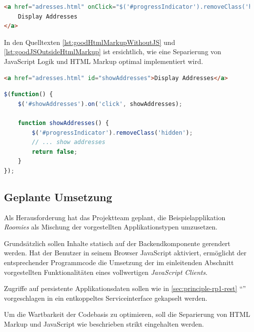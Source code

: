 \begin{lstlisting}[language=HTML, caption={Beispiel einer Vermischung von HTML Markup und JavaScript}, label={lst:badHtmlMarkupWithJavaScript}]
<a href="adresses.html" onClick="$('#progressIndicator').removeClass('hidden');showAddresses();return false;">
	Display Addresses
</a>
\end{lstlisting}

In den Quelltexten \ref{lst:goodHtmlMarkupWithoutJS} und \ref{lst:goodJSOutsideHtmlMarkup} ist ersichtlich, wie eine Separierung von JavaScript Logik und HTML Markup optimal implementiert wird.

\begin{lstlisting}[language=HTML, caption={Beispiel eines sauberen HTML Markups ohne JavaScript}, label={lst:goodHtmlMarkupWithoutJS}]
<a href="adresses.html" id="showAddresses">Display Addresses</a>
\end{lstlisting}

\begin{lstlisting}[language=JavaScript, caption={Beispiel Event-Handler in ausgelagerter JavaScript Datei}, label={lst:goodJSOutsideHtmlMarkup}]
$(function() {
	$('#showAddresses').on('click', showAddresses);

	function showAddresses() {
		$('#progressIndicator').removeClass('hidden');
		// ... show addresses
		return false;
	}
});
\end{lstlisting}


\subsection*{Geplante Umsetzung}

Als Herausforderung hat das Projektteam geplant, die Beispielapplikation \emph{Roomies} als Mischung der vorgestellten Applikationstypen umzusetzen.

Grundsätzlich sollen Inhalte statisch auf der Backendkomponente gerendert werden. Hat der Benutzer in seinem Browser JavaScript aktiviert, ermöglicht der entsprechender Programmcode die Umsetzung der im einleitenden Abschnitt vorgestellten Funktionalitäten eines vollwertigen \emph{JavaScript Clients}.

Zugriffe auf persistente Applikationsdaten sollen wie in \ref{sec:principle-rp1-rest} ``'' vorgeschlagen in ein entkoppeltes Serviceinterface gekapselt werden.

Um die Wartbarkeit der Codebasis zu optimieren, soll die Separierung von HTML Markup und JavaScript wie beschrieben strikt eingehalten werden.


